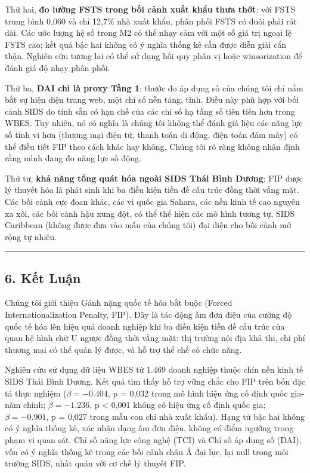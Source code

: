 \documentclass[12pt,a4paper]{article}
\begin{document}
Thứ hai, \textbf{đo lường FSTS trong bối cảnh xuất khẩu thưa thớt}: với
FSTS trung bình 0,060 và chỉ 12,7\% nhà xuất khẩu, phân phối FSTS có
đuôi phải rất dài. Các ước lượng hệ số trong M2 có thể nhạy cảm với một
số giá trị ngoại lệ FSTS cao; kết quả bậc hai không có ý nghĩa thống kê
cần được diễn giải cẩn thận. Nghiên cứu tương lai có thể sử dụng hồi quy
phân vị hoặc winsorization để đánh giá độ nhạy phân phối.

Thứ ba, \textbf{DAI chỉ là proxy Tầng 1}: thước đo áp dụng số của chúng
tôi chỉ nắm bắt sự hiện diện trang web, một chỉ số nền tảng, tĩnh. Điều
này phù hợp với bối cảnh SIDS do tính sẵn có hạn chế của các chỉ số hạ
tầng số tiên tiến hơn trong WBES. Tuy nhiên, nó có nghĩa là chúng tôi
không thể đánh giá liệu các năng lực số tinh vi hơn (thương mại điện tử,
thanh toán di động, điện toán đám mây) có thể điều tiết FIP theo cách
khác hay không. Chúng tôi rõ ràng không nhận định rằng mình đang đo năng
lực số động.

Thứ tư, \textbf{khả năng tổng quát hóa ngoài SIDS Thái Bình Dương}: FIP
được lý thuyết hóa là phát sinh khi ba điều kiện tiền đề cấu trúc đồng
thời vắng mặt. Các bối cảnh cực đoan khác, các vi quốc gia Sahara, các
nền kinh tế cao nguyên xa xôi, các bối cảnh hậu xung đột, có thể thể
hiện các mô hình tương tự. SIDS Caribbean (không được đưa vào mẫu của
chúng tôi) đại diện cho bối cảnh mở rộng tự nhiên.

\begin{center}\rule{0.5\linewidth}{0.5pt}\end{center}

\hypertarget{6-kux1ebft-luux1eadn}{%
\subsection{6. Kết Luận}\label{6-kux1ebft-luux1eadn}}

Chúng tôi giới thiệu Gánh nặng quốc tế hóa bắt buộc (Forced
Internationalization Penalty, FIP). Đây là tác động âm đơn điệu của
cường độ quốc tế hóa lên hiệu quả doanh nghiệp khi ba điều kiện tiền đề
cấu trúc của quan hệ hình chữ U ngược đồng thời vắng mặt: thị trường nội
địa khả thi, chi phí thương mại có thể quản lý được, và hỗ trợ thể chế
có chức năng.

Nghiên cứu sử dụng dữ liệu WBES từ 1.469 doanh nghiệp thuộc chín nền
kinh tế SIDS Thái Bình Dương. Kết quả tìm thấy hỗ trợ vững chắc cho FIP
trên bốn đặc tả thực nghiệm (\(\beta = −0.404\), p = 0,032 trong mô hình
hiệu ứng cố định quốc gia-năm chính; \(\beta = −1.236\), p \textless{}
0,001 không có hiệu ứng cố định quốc gia; \(\beta = −0.901\), p = 0,027
trong mẫu con chỉ nhà xuất khẩu). Hạng tử bậc hai không có ý nghĩa thống
kê, xác nhận dạng âm đơn điệu, không có điểm ngưỡng trong phạm vi quan
sát. Chỉ số năng lực công nghệ (TCI) và Chỉ số áp dụng số (DAI), vốn có
ý nghĩa thống kê trong các bối cảnh châu Á đại lục, lại null trong môi
trường SIDS, nhất quán với cơ chế lý thuyết FIP.
\end{document}

